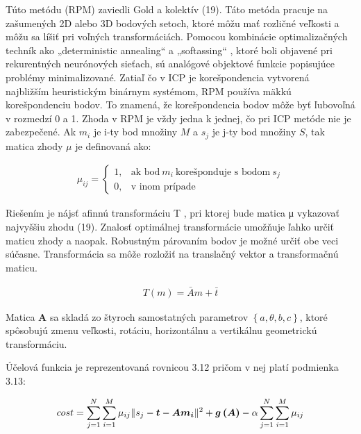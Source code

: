 Túto metódu (RPM) zaviedli Gold a kolektív (19). Táto metóda pracuje na zašumených 2D alebo 3D bodových setoch, ktoré môžu mať rozličné veľkosti a môžu sa líšiť pri voľných transformáciách. Pomocou kombinácie optimalizačných techník ako „deterministic annealing“ a „softassing“ , ktoré boli objavené pri rekurentných neurónových sieťach, sú analógové objektové funkcie popisujúce problémy minimalizované. Zatiaľ čo v ICP je korešpondencia vytvorená najbližším heuristickým binárnym systémom, RPM používa mäkkú korešpondenciu bodov. To znamená, že korešpondencia bodov môže byť ľubovoľná v rozmedzí 0 a 1. Zhoda v RPM je vždy jedna k jednej, čo pri ICP metóde nie je zabezpečené. Ak $m_i$ je i-ty bod množiny $M$ a $s_j$ je j-ty bod množiny $S$, tak matica zhody $\mu$ je definovaná ako:

\begin{equation}
\label{eq10}
\begin{aligned}
\mu_{ij}=
\begin{cases}
1, & \text{ak bod}\ m_i\ \text{korešponduje s bodom}\ s_j \\
0, & \text{v inom prípade}
\end{cases}
\end{aligned}
\end{equation}

Riešením je nájsť afinnú transformáciu T , pri ktorej bude matica μ vykazovať najvyššiu zhodu (19). Znalosť optimálnej transformácie umožňuje ľahko určiť maticu zhody a naopak. Robustným párovaním bodov je možné určiť obe veci súčasne. Transformácia sa môže rozložiť na translačný vektor a transformačnú maticu.

\begin{equation}
\label{eq11}
\begin{aligned}
T\left(m\right)=\bar{A}m+\bar{t}
\end{aligned}
\end{equation}

Matica \textbf{A} sa skladá zo štyroch samostatných parametrov $\left\lbrace a, \theta, b, c \right\rbrace$, ktoré spôsobujú zmenu veľkosti, rotáciu, horizontálnu a vertikálnu geometrickú transformáciu.

Účelová funkcia je reprezentovaná rovnicou 3.12 pričom v nej platí podmienka 3.13:

\begin{equation}
\label{eq12}
\begin{aligned}
cost=\sum_{j=1}^{N}\sum_{i=1}^{M} \mu_{ij} \Arrowvert s_j - \boldsymbol{t} - \boldsymbol{Am_i} \Arrowvert^2 + \boldsymbol{g\left(A\right)} -\alpha \sum_{j=1}^{N}\sum_{i=1}^{M} \mu_{ij}
\end{aligned}
\end{equation}

